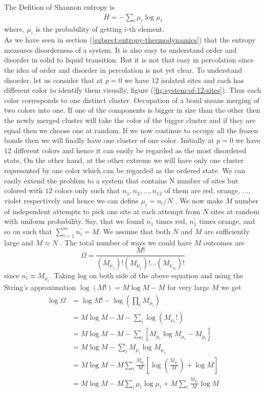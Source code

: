 	The Defition of Shannon entropy is
	\begin{align}
		H = - \sum_{i} \mu_i \log \mu_i	
		\label{def:shannon-entropy-def}
	\end{align}
	where, $\mu_i$ is the probability of getting $i$-th element.\\
	As we have seen in section (\ref{subsect:entropy-thermodynamics}) that the entropy measures disorderness of a system. It is also easy to understand	order and disorder in solid to liquid transition. But it is not that easy in percolation since the idea of order and disorder in percolation is not yet clear. To understand	disorder, let us consider that at $p=0$ we have $12$ isolated	sites and each has different color to identify them visually, figure (\ref{fig:system-of-12-sites}). Thus each color corresponds to one distinct cluster. Occupation of a bond means merging of two colors into	one. If one of the components is bigger in size than the	other then the newly merged cluster will take the color	of the bigger cluster and if they are equal then we choose	one at random. If we now continue to occupy all the	frozen bonds then we will finally have one cluster of one	color. Initially at $p = 0$ we have $12$ different colors and	hence it can easily be regarded as the most disordered	state. On the other hand, at the other extreme we will	have only one cluster represented by one color which can	be regarded as the ordered state. We can easily extend	the problem to a system that contains N number of sites	but colored with $12$ colors only such that $n_1, n_2, \ldots, n_{12}$ of them are red, orange, ..., violet respectively and hence	we can define $\mu_i = n_i /N$ . We now make $M$ number of	independent attempts to pick one site at each attempt	from $N$ sites at random with uniform probability. Say, that we found $n_1^\prime$ times red, $n_1^\prime$ times orange, and so on	such that $\sum_{i=1}^{m} n_i^\prime = M$. We assume that both $N$ and $M$ are sufficiently large and $M \approx N$ . The total number	of ways we could have $M$ outcomes are
	\begin{equation}
		\Omega = \frac{M!}{\left(M_{\mu_1}\right)! \left(M_{\mu_2}\right)!\ldots\left(M_{\mu_m}\right)!}
	\end{equation}
	since $n_i^\prime \approx M_{\mu_i}$. Taking log on both side of the above equation and using the String's approximation $\log (M!)  = M \log M - M$ for very large $M$ we get
	\begin{align}
		\log \Omega 
		&= \log M! - \log \left(\prod_{i} M_{\mu_i}\right) \nonumber \\
		&= M\log M - M - \sum_{i} \log \left(M_{\mu_i}!\right) \nonumber \\
		&= M\log M - M - \sum_{i} \left[M_{\mu_i}\log M_{\mu_i} - M_{\mu_i}\right] \nonumber \\
		&= M\log M - \sum_{i} M_{\mu_i}\log M_{\mu_i} \nonumber \\
		&=  M\log M - M \sum_{i} \frac{M_{\mu_i}}{M} \left[\log \left(\frac{M_{\mu_i}}{M}\right) + \log M \right] \nonumber \\
		&= M\log M - M \sum_{i} \mu_i  \log \mu_i + M \sum_{i} \frac{M_{\mu_i}}{M} \log M
	\end{align}
